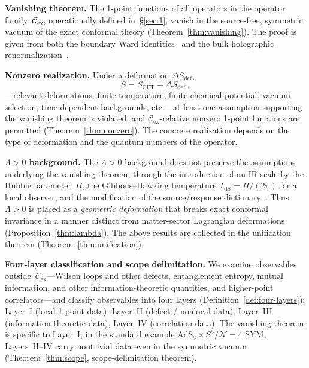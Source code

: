 \documentclass[
  aps,
  prd,
  preprint,
  groupedaddress,
  nofootinbib,
  longbibliography
]{revtex4-2}
\theoremstyle{remark}
\newcommand{\Cex}{\mathcal{C}_{\mathrm{ex}}}
\newcommand{\N}{\mathcal{N}}
\newcommand{\AdS}{\mathrm{AdS}}
\newcommand{\dS}{\mathrm{dS}}
\begin{document}
\textbf{Vanishing theorem.}
The 1-point functions of all operators in the operator
family~$\Cex$, operationally defined in~\S\ref{sec:1},
vanish in the source-free, symmetric vacuum of the exact
conformal theory (Theorem~\ref{thm:vanishing}).
The proof is given from both the boundary Ward
identities~\cite{ref5,ref6,ref13,ref14} and the bulk
holographic renormalization~\cite{ref9,ref10,ref11,ref12}.

\textbf{Nonzero realization.}
Under a deformation $\Delta S_{\mathrm{def}}$,
\begin{equation}\label{eq:intro-deformation}
  S = S_{\mathrm{CFT}} + \Delta S_{\mathrm{def}}\,,
\end{equation}
---relevant deformations, finite temperature, finite chemical
potential, vacuum selection, time-dependent backgrounds, etc.---at
least one assumption supporting the vanishing theorem is violated,
and $\Cex$-relative nonzero 1-point functions are
permitted (Theorem~\ref{thm:nonzero}).
The concrete realization depends on the type of deformation
and the quantum numbers of the operator.

\textbf{$\Lambda>0$ background.}
The $\Lambda>0$ background does not preserve the assumptions
underlying the vanishing theorem, through the introduction
of an IR scale by the Hubble parameter~$H$, the Gibbons--Hawking
temperature $T_{\dS}=H/(2\pi)$ for a local observer, and the
modification of the source/response
dictionary~\cite{ref15,ref16,ref17,ref18,ref19,ref20,ref21}.
Thus $\Lambda>0$ is placed as a \emph{geometric deformation}
that breaks exact conformal invariance in a manner distinct
from matter-sector Lagrangian deformations
(Proposition~\ref{thm:lambda}).
The above results are collected in the unification
theorem (Theorem~\ref{thm:unification}).

\textbf{Four-layer classification and scope delimitation.}
We examine observables outside~$\Cex$---Wilson loops and other
defects, entanglement entropy, mutual information, and other
information-theoretic quantities, and higher-point
correlators---and classify observables into four layers
(Definition~\ref{def:four-layers}):
Layer~I (local 1-point data),
Layer~II (defect / nonlocal data),
Layer~III (information-theoretic data),
Layer~IV (correlation data).
The vanishing theorem is specific to Layer~I;
in the standard example $\AdS_5\times S^5 / \N=4$ SYM,
Layers~II--IV carry nontrivial data even in the symmetric
vacuum (Theorem~\ref{thm:scope}, scope-delimitation theorem).
\end{document}
